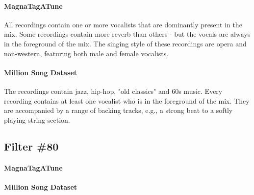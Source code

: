 \paragraph{MagnaTagATune}
All recordings contain one or more vocalists that are dominantly present in the mix. Some recordings contain more reverb than others - but the vocals are always in the foreground of the mix. The singing style of these recordings are opera and non-western, featuring both male and female vocalists.

\paragraph{Million Song Dataset}
The recordings contain jazz, hip-hop, "old classics" and 60s music. Every recording contains at least one vocalist who is in the foreground of the mix. They are accompanied by a range of backing tracks, e.g., a strong beat to a softly playing string section.


\subsection*{Filter \#80}
\paragraph{MagnaTagATune}

\paragraph{Million Song Dataset}



